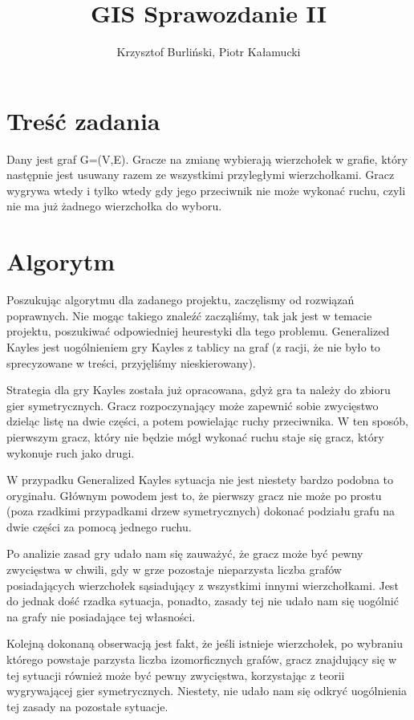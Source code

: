 \documentclass[11pt,a4paper]{article}
\title{GIS Sprawozdanie II}
\author{Krzysztof Burliński, Piotr Kałamucki}
\begin{document}
\maketitle
\tableofcontents
\newpage
\section{Treść zadania}Dany jest graf G=(V,E). Gracze na zmianę wybierają wierzchołek w grafie, który następnie jest usuwany razem ze wszystkimi przyległymi wierzchołkami. Gracz wygrywa wtedy i tylko wtedy gdy jego przeciwnik nie może wykonać ruchu, czyli nie ma już żadnego wierzchołka do wyboru.
\section{Algorytm}
Poszukując algorytmu dla zadanego projektu, zaczęlismy od rozwiązań poprawnych. Nie mogąc takiego znaleźć zacząliśmy, tak jak jest w temacie projektu, poszukiwać odpowiedniej heurestyki dla tego problemu. Generalized Kayles jest uogólnieniem gry Kayles z tablicy na graf (z racji, że nie było to sprecyzowane w treści, przyjęliśmy nieskierowany). 

Strategia dla gry Kayles została już opracowana, gdyż gra ta należy do zbioru gier symetrycznych. Gracz rozpoczynający może zapewnić sobie zwycięstwo dzieląc listę na dwie części, a potem powielając ruchy przeciwnika. W ten sposób, pierwszym gracz, który nie będzie mógł wykonać ruchu staje się gracz, który wykonuje ruch jako drugi.

W przypadku Generalized Kayles sytuacja nie jest niestety bardzo podobna to oryginału. Głównym powodem jest to, że pierwszy gracz nie może po prostu (poza rzadkimi przypadkami drzew symetrycznych) dokonać podziału grafu na dwie części za pomocą jednego ruchu. 

Po analizie zasad gry udało nam się zauważyć, że gracz może być pewny zwycięstwa w chwili, gdy w grze pozostaje nieparzysta liczba grafów posiadających wierzchołek sąsiadujący z wszystkimi innymi wierzchołkami. Jest do jednak dość rzadka sytuacja, ponadto, zasady tej nie udało nam się uogólnić na grafy nie posiadające tej własności.

Kolejną dokonaną obserwacją jest fakt, że jeśli istnieje wierzchołek, po wybraniu którego powstaje parzysta liczba izomorficznych grafów, gracz znajdujący się w tej sytuacji również może być pewny zwycięstwa, korzystając z teorii wygrywającej gier symetrycznych. Niestety, nie udało nam się odkryć uogólnienia tej zasady na pozostałe sytuacje. 
\end{document}
